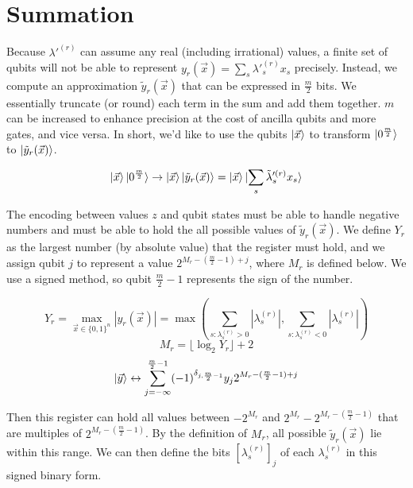 \section{Summation}

Because $\lambda'^{(r)}$ can assume any real (including irrational) values, a finite set of qubits will not be able to represent $y_r(\vec{x}) = \sum_s \lambda'^{(r)}_s x_s$ precisely. Instead, we compute an approximation $\tilde{y}_r(\vec{x})$ that can be expressed in $\frac{m}{2}$ bits. We essentially truncate (or round) each term in the sum and add them together. $m$ can be increased to enhance precision at the cost of ancilla qubits and more gates, and vice versa. In short, we'd like to use the qubits $\ket{\vec{x}}$ to transform $\ket{0^{\frac{m}{2}}}$ to $\ket{\tilde{y}_r(\vec{x})}$.

\begin{equation}
    \ket{\vec{x}}\ket{0^{\frac{m}{2}}} \rightarrow \ket{\vec{x}}\ket{\tilde{y}_r(\vec{x})} = \ket{\vec{x}}\ket{\sum_s \tilde{\lambda}'^{(r)}_s x_s}
    \label{eq: summation2}
\end{equation}

The encoding between values $z$ and qubit states must be able to handle negative numbers and must be able to hold the all possible values of $\tilde{y}_r(\vec{x})$. We define $Y_r$ as the largest number (by absolute value) that the register must hold, and we assign qubit $j$ to represent a value $2^{M_r - (\frac{m}{2} - 1) + j}$, where $M_r$ is defined below. We use a signed method, so qubit $\frac{m}{2} - 1$ represents the sign of the number. 

\begin{equation}
    Y_r = \max_{\vec{x} \in \{0, 1\}^n} |y_r(\vec{x})| = \max\left(\sum_{s : \lambda^{(r)}_s > 0} |\lambda^{(r)}_s|, \sum_{s : \lambda^{(r)}_s < 0} |\lambda^{(r)}_s|\right)
\end{equation}
\begin{equation}
    M_r = \lfloor \log_2{Y_r} \rfloor + 2
\end{equation}
\begin{equation}
    \ket{\vec{y}} \leftrightarrow \sum_{j = -\infty}^{\frac{m}{2} - 1} (-1)^{\delta_{j, \frac{m}{2} - 1}}y_j2^{M_r - (\frac{m}{2} - 1) + j}
\end{equation}

Then this register can hold all values between $-2^{M_r}$ and $2^{M_r} - 2^{M_r - (\frac{m}{2} - 1)}$ that are multiples of $2^{M_r - (\frac{m}{2} - 1)}$. By the definition of $M_r$, all possible $\tilde{y}_r(\vec{x})$ lie within this range. We can then define the bits $[\lambda^{(r)}_s]_j$ of each $\lambda^{(r)}_s$ in this signed binary form.


